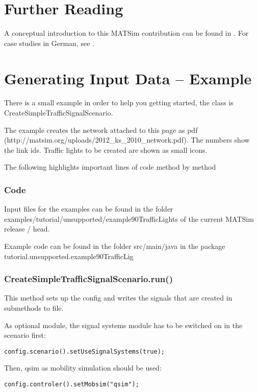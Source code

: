 \section{Further Reading}

A conceptual introduction to this MATSim contribution can be found in \cite{Grether2014PhD}. 
For case studies in German, see \cite{Bischoff2010BaSylvia,Neumann2008DA,Roeder2010BachelorGershenson}.

\section{Generating Input Data -- Example}

There is a small example in order to help you getting started, the class is CreateSimpleTrafficSignalScenario.

The example creates the network attached to this page as pdf (http://matsim.org/uploads/2012\_ks\_2010\_network.pdf). The numbers show the link ids. Traffic lights to be created are shown as small icons.

The following highlights important lines of code method by method

\subsubsection{Code}

Input files for the examples can be found in the folder examples/tutorial/unsupported/example90TrafficLights of the current MATSim release / head.

Example code can be found in the folder src/main/java in the package tutorial.unsupported.example90TrafficLig

\subsubsection{CreateSimpleTrafficSignalScenario.run()}

This method sets up the config and writes the signals that are created in submethods to file.

As optional module, the signal systems module has to be switched on in the scenario first:


\texttt{\nolinebreak config.scenario().setUseSignalSystems(true);}

Then, qsim as mobility simulation should be used:


\texttt{\nolinebreak config.controler().setMobsim("qsim"); \nolinebreak }


